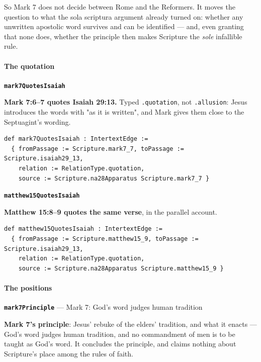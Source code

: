 \documentclass[11pt]{article}
\begin{document}
So Mark 7 does not decide between Rome and the Reformers. It moves the question to what the sola scriptura argument already turned on: whether any unwritten apostolic word survives and can be identified — and, even granting that none does, whether the principle then makes Scripture the \emph{sole} infallible rule.

\paragraph*{The quotation}
\leavevmode\par
\par\medskip\noindent\textbf{\texttt{mark7\allowbreak{}Quotes\allowbreak{}Isaiah}}\par\nobreak\noindent
\textbf{Mark 7:6–7 quotes Isaiah 29:13.} Typed \texttt{.quotation}, not \texttt{.allusion}: Jesus introduces the words with "as it is written", and Mark gives them close to the Septuagint's wording.

{\small\begin{verbatim}
def mark7QuotesIsaiah : IntertextEdge :=
  { fromPassage := Scripture.mark7_7, toPassage := Scripture.isaiah29_13,
    relation := RelationType.quotation,
    source := Scripture.na28Apparatus Scripture.mark7_7 }
\end{verbatim}}
\par\medskip\noindent\textbf{\texttt{matthew15\allowbreak{}Quotes\allowbreak{}Isaiah}}\par\nobreak\noindent
\textbf{Matthew 15:8–9 quotes the same verse}, in the parallel account.

{\small\begin{verbatim}
def matthew15QuotesIsaiah : IntertextEdge :=
  { fromPassage := Scripture.matthew15_9, toPassage := Scripture.isaiah29_13,
    relation := RelationType.quotation,
    source := Scripture.na28Apparatus Scripture.matthew15_9 }
\end{verbatim}}
\paragraph*{The positions}
\leavevmode\par
\par\medskip\noindent\textbf{\texttt{mark7\allowbreak{}Principle}} --- Mark 7: God's word judges human tradition\par\nobreak\noindent
\textbf{Mark 7's principle}: Jesus' rebuke of the elders' tradition, and what it enacts — God's word judges human tradition, and no commandment of men is to be taught as God's word. It concludes the principle, and claims nothing about Scripture's place among the rules of faith.
\end{document}
